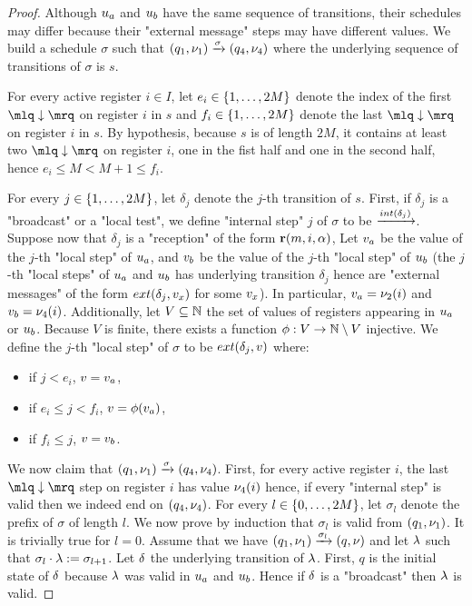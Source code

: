 \begin{proof}
Although $u_a$ and $u_b$ have the same sequence of transitions, their schedules may differ because their "external message" steps may have different values.
We build a schedule $\sigma$ such that $(q_1,\nu_1) \xrightarrow{\sigma} (q_4, \nu_4)$ where the underlying sequence of transitions of $\sigma$ is $s$.

For every active register $i \in I$, let $e_i \in \{1,\dots,2M\}$ denote the index of the first $\quotemarks{\enregact}$ on register $i$ in $s$ and $f_i \in \{1,\dots,2M\}$ denote the last $\quotemarks{\enregact}$ on register $i$ in $s$. By hypothesis, because $s$ is of length $2M$, it contains at least two $\quotemarks{\enregact}$ on register $i$, one in the fist half and one in the second half, hence $e_i \leq M < M +1 \leq f_i$. 

For every $j \in \{1,\dots,2M\}$, let $\delta_j$ denote the $j$-th transition of $s$. First, if  $\delta_j$ is a "broadcast" or a "local test", we define "internal step" $j$ of $\sigma$ to be $\intstep{\delta_j}$. 
Suppose now that $\delta_j$ is a "reception" of the form $\textbf{r}(m, i, \alpha)$, Let $v_a$ be the value of the $j$-th "local step" of $u_a$, and $v_b$ be the value of the $j$-th "local step" of $u_b$
 (the $j$-th "local steps" of $u_a$ and $u_b$ has underlying transition $\delta_j$ hence are "external messages" of the form $\extlabel{\delta_j}{\aval_x}$ for some $v_x$). In particular, $v_a= \nu_2(i)$ and $v_b = \nu_4(i)$. 
  Additionally, let $V \subseteq \mathbb{N}$ the set of values of registers appearing in $u_a$ or $u_b$. Because $V$ is finite, there exists a function $\phi: V \rightarrow \mathbb{N} \setminus V$ injective.
We define the $j$-th "local step" of $\sigma$ to be $\extlabel{\delta_j}{\aval}$ where:
\begin{itemize} 
\item if $j < e_i$, $v = v_a$,
\item if $e_i \leq j < f_i$, $v = \phi(v_a)$,
\item if $f_i \leq j$, $v = v_b$.
\end{itemize}
We now claim that $(q_1,\nu_1) \xrightarrow{\sigma} (q_4,\nu_4)$. 
First, for every active register $i$, the last $\quotemarks{\enregact}$ step on register $i$ has value $\nu_4(i)$ hence, if every "internal step" is valid then we indeed end on $(q_4, \nu_4)$.
For every $l \in \{0,\dots,2M\}$, let $\sigma_l$ denote the prefix of $\sigma$ of length $l$.
We now prove by induction that $\sigma_l$ is valid from $(q_1, \nu_1)$. It is trivially true for $l =0$. Assume that we have $(q_1, \nu_1) \xrightarrow{\sigma_l} (q, \nu)$ and let $\lambda$ such that $\sigma_l \cdot \lambda := \sigma_{l+1}$. Let $\delta$ the underlying transition of $\lambda$.
First, $q$ is the initial state of $\delta$ because $\lambda$ was valid in $u_a$ and $u_b$. Hence if $\delta$ is a "broadcast" then $\lambda$ is valid.


\end{proof}
